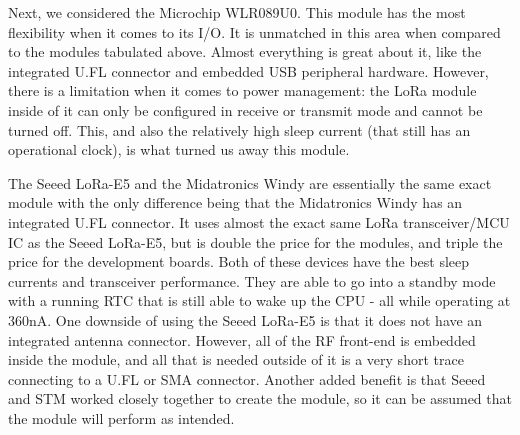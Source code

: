 Next, we considered the Microchip WLR089U0. This module has the most flexibility
when it comes to its I/O. It is unmatched in this area when compared to the
modules tabulated above. Almost everything is great about it, like the
integrated U.FL connector and embedded USB peripheral hardware. However, there
is a limitation when it comes to power management: the LoRa module inside of it
can only be configured in receive or transmit mode and cannot be turned off.
This, and also the relatively high sleep current (that still has an operational
clock), is what turned us away this module.

The Seeed LoRa-E5 and the Midatronics Windy are essentially the same exact
module with the only difference being that the Midatronics Windy has an
integrated U.FL connector. It uses almost the exact same LoRa transceiver/MCU IC
as the Seeed LoRa-E5, but is double the price for the modules, and triple the
price for the development boards. Both of these devices have the best sleep
currents and transceiver performance. They are able to go into a standby mode
with a running RTC that is still able to wake up the CPU - all while operating
at 360nA. One downside of using the Seeed LoRa-E5 is that it does not have an
integrated antenna connector. However, all of the RF front-end is embedded
inside the module, and all that is needed outside of it is a very short trace
connecting to a U.FL or SMA connector. Another added benefit is that Seeed and
STM worked closely together to create the module, so it can be assumed that the
module will perform as intended.
